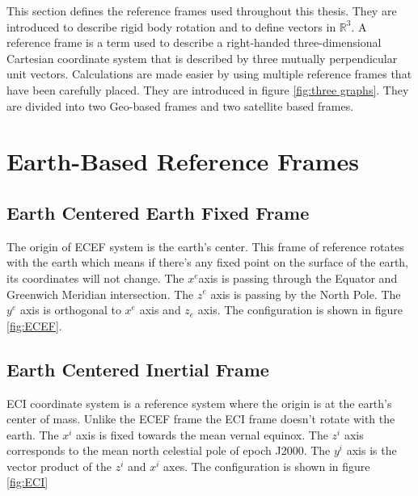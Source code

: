 This section defines the reference frames used throughout this thesis. They are introduced to describe rigid body rotation and to define vectors in $\mathbb{R}^3$. A reference frame is a term used to describe a right-handed three-dimensional Cartesian coordinate system that is described by three mutually perpendicular unit vectors. Calculations are made easier by using multiple reference frames that have been carefully placed. They are introduced in figure \ref{fig:three graphs}. They are divided into two Geo-based frames and two satellite based frames.

\section{Earth-Based Reference Frames}
\subsection{Earth Centered Earth Fixed Frame}
The origin of ECEF system is the earth's center. This frame of reference rotates with the earth which means if there’s any fixed point on the surface of the earth, its coordinates will not change. The $x^e$axis is passing through the Equator and Greenwich Meridian intersection. The $z^e$ axis is passing by the North Pole. The $y^e$ axis is orthogonal to $x^e$ axis and $z_e$ axis. The configuration is shown in figure \ref{fig:ECEF}.

\subsection{Earth Centered Inertial Frame}
ECI coordinate system is a reference system where the origin is at the earth's center of mass. Unlike the ECEF frame the ECI frame doesn't rotate with the earth. The $x^i$ axis is fixed towards the mean vernal equinox. The $z^i$ axis corresponds to the mean north celestial pole of epoch J2000.  The $y^i$ axis is the vector product of the $z^i$ and $x^i$ axes. The configuration is shown in figure \ref{fig:ECI}

